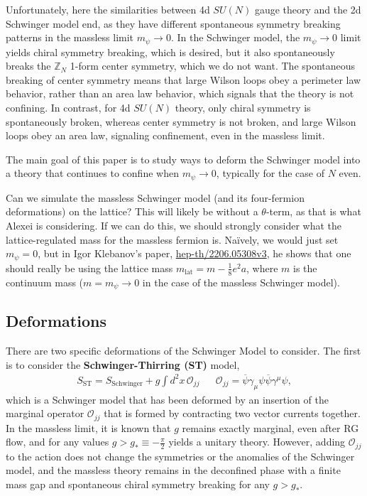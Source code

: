 Unfortunately, here the similarities between 4d $SU(N)$ gauge theory and the 2d Schwinger model end, as they have different spontaneous symmetry breaking patterns in the massless limit $m_\psi\rightarrow 0$. In the Schwinger model, the $m_\psi\rightarrow 0$ limit yields chiral symmetry breaking, which is desired, but it also spontaneously breaks the $\mathbb Z_N$ 1-form center symmetry, which we do not want. The spontaneous breaking of center symmetry means that large Wilson loops obey a perimeter law behavior, rather than an area law behavior, which signals that the theory is not confining. In contrast, for 4d $SU(N)$ theory, only chiral symmetry is spontaneously broken, whereas center symmetry is not broken, and large Wilson loops obey an area law, signaling confinement, even in the massless limit. 

The main goal of this paper is to study ways to deform the Schwinger model into a theory that continues to confine when $m_\psi\rightarrow 0$, typically for the case of $N$ even. 

\begin{interlude}
	Can we simulate the massless Schwinger model (and its four-fermion deformations) on the lattice? This will likely be without a $\theta$-term, as that is what Alexei is considering. If we can do this, we should strongly consider what the lattice-regulated mass for the massless fermion is. Na\"ively, we would just set $m_\psi = 0$, but in Igor Klebanov's paper, \href{https://arxiv.org/abs/2206.05308}{hep-th/2206.05308v3}, he shows that one should really be using the lattice mass $m_\mathrm{lat} = m - \frac{1}{8}e^2 a$, where $m$ is the continuum mass ($m = m_\psi\rightarrow 0$ in the case of the massless Schwinger model). 
\end{interlude}

\subsection{Deformations}

There are two specific deformations of the Schwinger Model to consider. The first is to consider the \textbf{Schwinger-Thirring (ST)} model,
\begin{align}
	S_{\mathrm{ST}} = S_{\mathrm{Schwinger}} + g \int d^2 x\, \mathcal O_{jj} && \mathcal O_{jj} = \overline\psi \gamma_\mu \psi \overline\psi \gamma^\mu\psi,
\end{align}
which is a Schwinger model that has been deformed by an insertion of the marginal operator $\mathcal O_{jj}$ that is formed by contracting two vector currents together. In the massless limit, it is known that $g$ remains exactly marginal, even after RG flow, and for any values $g > g_*\equiv -\frac{\pi}{2}$ yields a unitary theory. However, adding $\mathcal O_{jj}$ to the action does not change the symmetries or the anomalies of the Schwinger model, and the massless theory remains in the deconfined phase with a finite mass gap and spontaneous chiral symmetry breaking for any $g > g_*$. 

